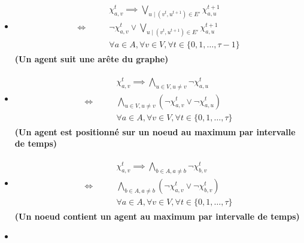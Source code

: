 \documentclass[french, 12pt, letterpaper]{article}
\theoremstyle{definition}
\theoremstyle{proposition}
\theoremstyle{example}
\begin{document}
    \begin{itemize}
        \item[] 
            \begin{align}
                \label{equ:contrainteA}
                \begin{split}
                    &\chi_{a, v}^t \implies \bigvee_{u\;|\;( v^t, u^{t+1} ) \in E'} \chi_{a, u}^{t+1}
                    \\\iff \qquad &\lnot \chi_{a, v}^t \lor \bigvee_{u\;|\;( v^t, u^{t+1} ) \in E'} \chi_{a, u}^{t+1}
                    \\&\forall a \in A, \forall v \in V, \forall t \in \{0, 1, \ldots, \tau-1\}
                \end{split}
            \end{align}
            \textbf{(Un agent suit une arête du graphe)}
        \item[] 
            \begin{align}
                \label{equ:contrainteB}
                \begin{split}
                    &\chi_{a, v}^t \implies \bigwedge_{u \in V, u \neq v} \lnot \chi_{a, u}^t
                    \\\iff \qquad &\bigwedge_{u \in V, u \neq v} (\lnot \chi_{a, v}^t \lor \lnot \chi_{a, u}^t)
                    \\&\forall a \in A, \forall v \in V, \forall t \in \{0, 1, \ldots, \tau\}
                \end{split}
            \end{align}
            \textbf{(Un agent est positionné sur un noeud au maximum par intervalle de temps)}
        \item[] 
            \begin{align}
                \label{equ:contrainteC}
                \begin{split}
                    &\chi_{a, v}^t \implies \bigwedge_{b \in A, a \neq b} \lnot \chi_{b, v}^t
                    \\\iff \qquad &\bigwedge_{b \in A, a \neq b} (\lnot \chi_{a, v}^t \lor \lnot \chi_{b, v}^t)
                    \\&\forall a \in A, \forall v \in V, \forall t \in \{0, 1, \ldots, \tau\}
                \end{split}
            \end{align}
            \textbf{(Un noeud contient un agent au maximum par intervalle de temps)}
        \item[] 

\end{itemize}
\end{document}

